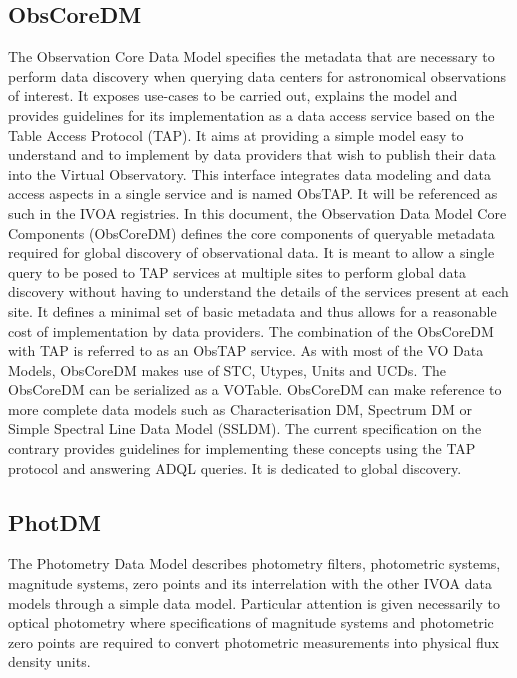 \documentclass[11pt,a4paper]{ivoa}
\begin{document}
\subsection{ObsCoreDM}

The Observation Core Data Model specifies the metadata that are necessary to perform data 
discovery when querying data centers for astronomical observations of interest. It exposes 
use-cases to be carried out, explains the model and provides guidelines for its implementation 
as a data access service based on the Table Access Protocol (TAP). It aims at providing a 
simple model easy to understand and to implement by data providers that wish to publish their 
data into the Virtual Observatory. This interface integrates data modeling and data access 
aspects in a single service and is named ObsTAP. It will be referenced as such in the IVOA 
registries. In this document, the Observation Data Model Core Components (ObsCoreDM) defines 
the core components of queryable metadata required for global discovery of observational data.
It is meant to allow a single query to be posed to TAP services at multiple sites to perform 
global data discovery without having to understand the details of the services present at each 
site. It defines a minimal set of basic metadata and thus allows for a reasonable cost of 
implementation by data providers. The combination of the ObsCoreDM with TAP is referred to 
as an ObsTAP service. As with most of the VO Data Models, ObsCoreDM makes use of STC, Utypes, 
Units and UCDs. The ObsCoreDM can be serialized as a VOTable. ObsCoreDM can make reference 
to more complete data models such as Characterisation DM, Spectrum DM or Simple Spectral Line 
Data Model (SSLDM). The current specification on the contrary provides guidelines for 
implementing these concepts using the TAP protocol and answering ADQL queries. It is 
dedicated to global discovery.

\subsection{PhotDM}

The Photometry Data Model describes photometry filters, photometric systems, magnitude 
systems, zero points and its interrelation with the other IVOA data models through a 
simple data model. Particular attention is given necessarily to optical photometry where 
specifications of magnitude systems and photometric zero points are required to convert 
photometric measurements into physical flux density units.
\end{document}
